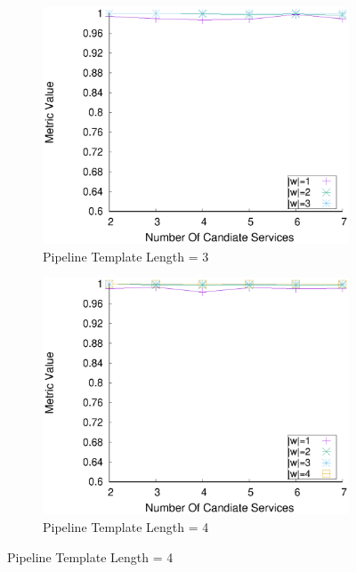     \begin{figure}[ht!]
      \centering
      \begin{subfigure}{0.49\textwidth}
        \includegraphics[width=\textwidth]{Images/graphs/window_quality_performance_diff_qual_n7_s7_50_80_n3}
        \caption{Pipeline Template Length = 3}
        \label{fig:quality_window_average_qualitative_n3}
      \end{subfigure}
      \hfill
      \begin{subfigure}{0.49\textwidth}
        \includegraphics[width=\textwidth]{Images/graphs/window_quality_performance_diff_qual_n7_s7_50_80_n4}
        \caption{Pipeline Template Length = 4}

\end{subfigure}
\end{figure}

